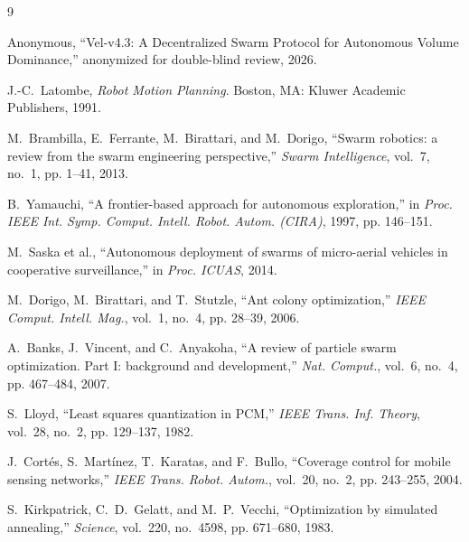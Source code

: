 \documentclass[10pt,journal]{IEEEtran}
\begin{document}
\begin{thebibliography}{9}

Anonymous, ``Vel-v4.3: A Decentralized Swarm Protocol for Autonomous Volume Dominance,'' anonymized for double-blind review, 2026.

J.-C.~Latombe, \emph{Robot Motion Planning}. Boston, MA: Kluwer Academic Publishers, 1991.

M.~Brambilla, E.~Ferrante, M.~Birattari, and M.~Dorigo, ``Swarm robotics: a review from the swarm engineering perspective,'' \emph{Swarm Intelligence}, vol.~7, no.~1, pp. 1--41, 2013.

B.~Yamauchi, ``A frontier-based approach for autonomous exploration,'' in \emph{Proc. IEEE Int. Symp. Comput. Intell. Robot. Autom. (CIRA)}, 1997, pp. 146--151.

M.~Saska et al., ``Autonomous deployment of swarms of micro-aerial vehicles in cooperative surveillance,'' in \emph{Proc. ICUAS}, 2014.

M.~Dorigo, M.~Birattari, and T.~Stutzle, ``Ant colony optimization,'' \emph{IEEE Comput. Intell. Mag.}, vol.~1, no.~4, pp. 28--39, 2006.

A.~Banks, J.~Vincent, and C.~Anyakoha, ``A review of particle swarm optimization. Part I: background and development,'' \emph{Nat. Comput.}, vol.~6, no.~4, pp. 467--484, 2007.

S.~Lloyd, ``Least squares quantization in {PCM},'' \emph{IEEE Trans. Inf. Theory}, vol.~28, no.~2, pp. 129--137, 1982.

J.~Cortés, S.~Martínez, T.~Karatas, and F.~Bullo, ``Coverage control for mobile sensing networks,'' \emph{IEEE Trans. Robot. Autom.}, vol.~20, no.~2, pp. 243--255, 2004.

S.~Kirkpatrick, C.~D.~Gelatt, and M.~P.~Vecchi, ``Optimization by simulated annealing,'' \emph{Science}, vol.~220, no.~4598, pp. 671--680, 1983.

\end{thebibliography}
\end{document}
